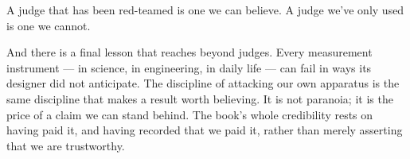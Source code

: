 A judge that has been red-teamed is one we can believe. A judge we've
only used is one we cannot.

And there is a final lesson that reaches beyond judges. Every
measurement instrument --- in science, in engineering, in daily life ---
can fail in ways its designer did not anticipate. The discipline of
attacking our own apparatus is the same discipline that makes a result
worth believing. It is not paranoia; it is the price of a claim we can
stand behind. The book's whole credibility rests on having paid it, and
having recorded that we paid it, rather than merely asserting that we
are trustworthy.
